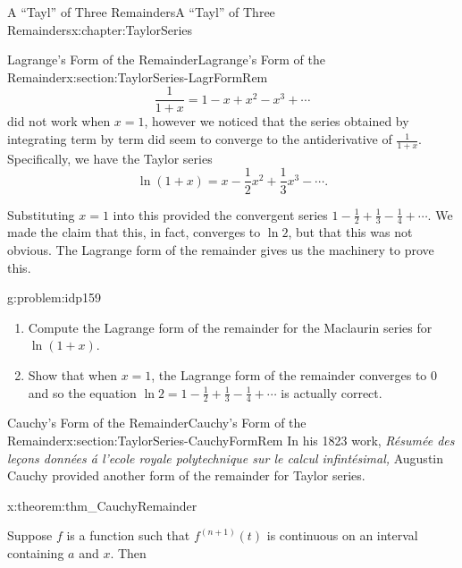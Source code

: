 \begin{chapterptx}{A ``Tayl'' of Three Remainders}{}{A ``Tayl'' of Three Remainders}{}{}{x:chapter:TaylorSeries}
\begin{sectionptx}{Lagrange's Form of the Remainder}{}{Lagrange's Form of the Remainder}{}{}{x:section:TaylorSeries-LagrFormRem}
		\begin{equation*}
			\frac{1}{1+x}=1-x+x^2-x^3+\cdots
		\end{equation*}
		did not work when \(x=1\), however we noticed that the series obtained by integrating term by term did seem to converge to the antiderivative of \(\frac{1}{1+x}\). Specifically, we have the Taylor series%
		\begin{equation*}
			\ln\left(1+x\right)=x-\frac{1}{2}x^2+\frac{1}{3}x^3-\cdots\text{.}
		\end{equation*}
		\par
		Substituting \(x=1\) into this provided the convergent series \(1-\frac{1}{2}+\frac{1}{3}-\frac{1}{4}+\cdots\). We made the claim that this, in fact, converges to \(\ln 2\), but that this was not obvious. The Lagrange form of the remainder gives us the machinery to prove this.%
		\begin{problem}{}{g:problem:idp159}%
			\begin{enumerate}[font=\bfseries,label=(\alph*),ref=\alph*]
				\item{}Compute the Lagrange form of the remainder for the Maclaurin series for \(\ln\left(1+x\right)\).%
				\item{}Show that when \(x=1\), the Lagrange form of the remainder converges to \(0\) and so the equation \(\ln 2=1-\frac{1}{2}+\frac{1}{3}-\frac{1}{4}+\cdots\) is actually correct.%
			\end{enumerate}
		\end{problem}
	\end{sectionptx}
	\typeout{************************************************}
	\typeout{************************************************}
	\begin{sectionptx}{Cauchy's Form of the Remainder}{}{Cauchy's Form of the Remainder}{}{}{x:section:TaylorSeries-CauchyFormRem}
		In his 1823 work, \textit{Résumée des leçons données á l'ecole royale polytechnique sur le calcul infintésimal,} Augustin Cauchy  provided another form of the remainder for Taylor series.%
		\begin{theorem}{}{}{x:theorem:thm_CauchyRemainder}%
			\par
			 Suppose \(f\) is a function such that \(f^{(n+1)}(t)\) is continuous on an interval containing \(a\) and \(x\). Then%
			\begin{equation*}

\end{equation*}
\end{theorem}
\end{sectionptx}
\end{chapterptx}
